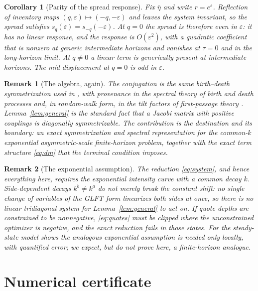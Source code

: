 \documentclass[11pt]{article}
\newtheorem{corollary}{Corollary}
\newtheorem{remark}{Remark}
\begin{document}
\begin{corollary}[Parity of the spread response]\label{cor:parity}
Fix $\bar\eta$ and write $r = e^{\varepsilon}$. Reflection of inventory maps $(q, \varepsilon) \mapsto (-q, -\varepsilon)$ and leaves the system invariant, so the spread satisfies $s_q(\varepsilon) = s_{-q}(-\varepsilon)$. At $q = 0$ the spread is therefore even in $\varepsilon$: it has no linear response, and the response is $O(\varepsilon^2)$, with a quadratic coefficient that is nonzero at generic intermediate horizons and vanishes at $\tau = 0$ and in the long-horizon limit. At $q \neq 0$ a linear term is generically present at intermediate horizons. The mid displacement at $q=0$ is odd in $\varepsilon$.
\end{corollary}

\begin{remark}[The algebra, again]
The conjugation is the same birth--death symmetrization used in \citet{cotton2026skew}, with provenance in the spectral theory of birth and death processes \citep{karlinmcgregor1957} and, in random-walk form, in the tilt factors of first-passage theory \citep{feller1968}. Lemma~\ref{lem:general} is the standard fact that a Jacobi matrix with positive couplings is diagonally symmetrizable. The contribution is the destination and its boundary: an exact symmetrization and spectral representation for the common-$k$ exponential asymmetric-scale finite-horizon problem, together with the exact term structure \eqref{eq:dm} that the terminal condition imposes.
\end{remark}

\begin{remark}[The exponential assumption]
The reduction \eqref{eq:system}, and hence everything here, requires the exponential intensity curve with a common decay $k$. Side-dependent decays $k^b \neq k^a$ do not merely break the constant shift: no single change of variables of the GLFT form linearizes both sides at once, so there is no linear tridiagonal system for Lemma~\ref{lem:general} to act on. If quote depths are constrained to be nonnegative, \eqref{eq:quotes} must be clipped where the unconstrained optimizer is negative, and the exact reduction fails in those states. For the steady-state model \citet{cotton2026skew} shows the analogous exponential assumption is needed only locally, with quantified error; we expect, but do not prove here, a finite-horizon analogue.
\end{remark}

\section{Numerical certificate}\label{sec:certificate}
\end{document}

